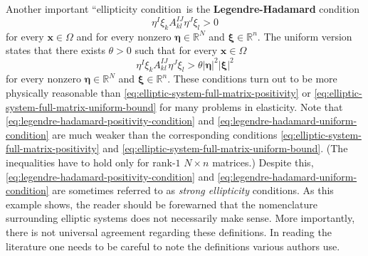 Another important ``ellipticity condition\textquotesingle\textquotesingle\ is the \textbf{Legendre-Hadamard} condition
\begin{equation}\label{eq:legendre-hadamard-positivity-condition}
\eta^I\xi_kA_{kl}^{IJ}\eta^J\xi_l>0
\end{equation}
for every $\bm{x}\in\Omega$ and for every nonzero $\bm{\eta}\in\mathbb{R}^N$ and $\bm{\xi}\in\mathbb{R}^n$. The uniform version states that there exists $\theta>0$ such that for every $\bm{x}\in\Omega$
\begin{equation}\label{eq:legendre-hadamard-uniform-condition}
\eta^I\xi_kA_{kl}^{IJ}\eta^J\xi_l>\theta|\bm{\eta}|^2|\bm{\xi}|^2
\end{equation}
for every nonzero $\bm{\eta}\in\mathbb{R}^N$ and $\bm{\xi}\in\mathbb{R}^n$. These conditions turn out to be more physically reasonable than \eqref{eq:elliptic-system-full-matrix-positivity} or \eqref{eq:elliptic-system-full-matrix-uniform-bound} for many problems in elasticity. Note that \eqref{eq:legendre-hadamard-positivity-condition} and \eqref{eq:legendre-hadamard-uniform-condition} are much weaker than the corresponding conditions \eqref{eq:elliptic-system-full-matrix-positivity} and \eqref{eq:elliptic-system-full-matrix-uniform-bound}. (The inequalities have to hold only for rank-$1$ $N\times n$ matrices.) Despite this, \eqref{eq:legendre-hadamard-positivity-condition} and \eqref{eq:legendre-hadamard-uniform-condition} are sometimes referred to as \emph{strong ellipticity} conditions. As this example shows, the reader should be forewarned that the nomenclature surrounding elliptic systems does not necessarily make sense. More importantly, there is not universal agreement regarding these definitions. In reading the literature one needs to be careful to note the definitions various authors use.
